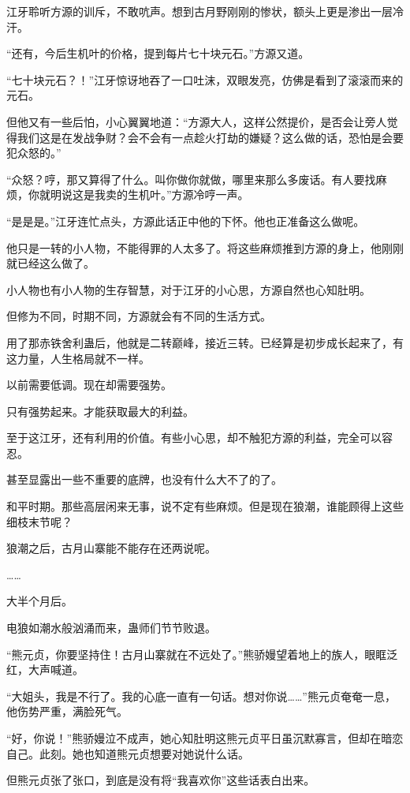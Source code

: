 \begin{this_body}
江牙聆听方源的训斥，不敢吭声。想到古月野刚刚的惨状，额头上更是渗出一层冷汗。

“还有，今后生机叶的价格，提到每片七十块元石。”方源又道。

“七十块元石？！”江牙惊讶地吞了一口吐沫，双眼发亮，仿佛是看到了滚滚而来的元石。

但他又有一些后怕，小心翼翼地道：“方源大人，这样公然提价，是否会让旁人觉得我们这是在发战争财？会不会有一点趁火打劫的嫌疑？这么做的话，恐怕是会要犯众怒的。”

“众怒？哼，那又算得了什么。叫你做你就做，哪里来那么多废话。有人要找麻烦，你就明说这是我卖的生机叶。”方源冷哼一声。

“是是是。”江牙连忙点头，方源此话正中他的下怀。他也正准备这么做呢。

他只是一转的小人物，不能得罪的人太多了。将这些麻烦推到方源的身上，他刚刚就已经这么做了。

小人物也有小人物的生存智慧，对于江牙的小心思，方源自然也心知肚明。

但修为不同，时期不同，方源就会有不同的生活方式。

用了那赤铁舍利蛊后，他就是二转巅峰，接近三转。已经算是初步成长起来了，有这力量，人生格局就不一样。

以前需要低调。现在却需要强势。

只有强势起来。才能获取最大的利益。

至于这江牙，还有利用的价值。有些小心思，却不触犯方源的利益，完全可以容忍。

甚至显露出一些不重要的底牌，也没有什么大不了的了。

和平时期。那些高层闲来无事，说不定有些麻烦。但是现在狼潮，谁能顾得上这些细枝末节呢？

狼潮之后，古月山寨能不能存在还两说呢。

……

大半个月后。

电狼如潮水般汹涌而来，蛊师们节节败退。

“熊元贞，你要坚持住！古月山寨就在不远处了。”熊骄嫚望着地上的族人，眼眶泛红，大声喊道。

“大姐头，我是不行了。我的心底一直有一句话。想对你说……”熊元贞奄奄一息，他伤势严重，满脸死气。

“好，你说！”熊骄嫚泣不成声，她心知肚明这熊元贞平日虽沉默寡言，但却在暗恋自己。此刻。她也知道熊元贞想要对她说什么话。

但熊元贞张了张口，到底是没有将“我喜欢你”这些话表白出来。


\end{this_body}
